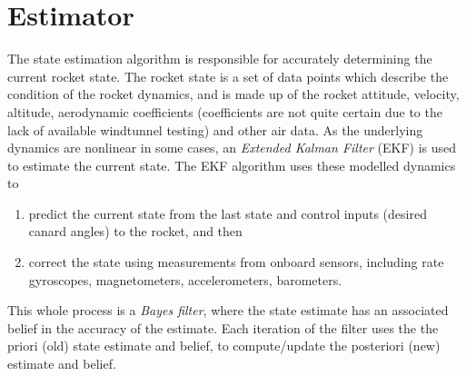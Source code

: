 \section{Estimator} \label{sec:estimator}
The state estimation algorithm is responsible for accurately determining the current rocket state.
The rocket state is a set of data points which describe the condition of the rocket dynamics, and is made up of the rocket attitude, velocity, altitude, aerodynamic coefficients (coefficients are not quite certain due to the lack of available windtunnel testing) and other air data.
As the underlying dynamics are nonlinear in some cases, an \textit{Extended Kalman Filter} (EKF) is used to estimate the current state. The EKF algorithm uses these modelled dynamics to
\begin{enumerate}
    \item predict the current state from the last state and control inputs (desired canard angles) to the rocket, and then
    \item correct the state using measurements from onboard sensors, including rate gyroscopes, magnetometers, accelerometers, barometers.
\end{enumerate}
This whole process is a \textit{Bayes filter}, where the state estimate has an associated belief in the accuracy of the estimate.
Each iteration of the filter uses the the priori (old) state estimate and belief, to compute/update the posteriori (new) estimate and belief.


